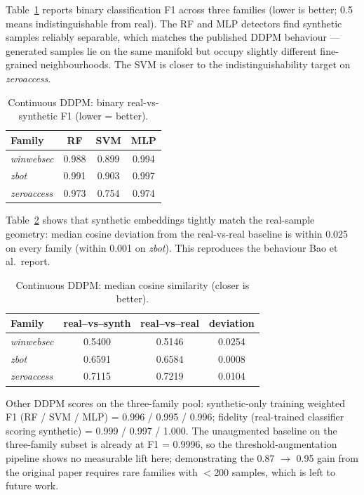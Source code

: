 \documentclass[runningheads]{llncs}
\begin{document}
Table~\ref{tab:ddpm-binclass} reports binary classification F1 across three
families (lower is better; 0.5 means indistinguishable from real). The RF and
MLP detectors find synthetic samples reliably separable, which matches the
published DDPM behaviour --- generated samples lie on the same manifold but
occupy slightly different fine-grained neighbourhoods. The SVM is closer to
the indistinguishability target on \emph{zeroaccess}.

\begin{table}[h]
\centering
\caption{Continuous DDPM: binary real-vs-synthetic F1 (lower = better).}
\label{tab:ddpm-binclass}
\begin{tabular}{lccc}
\toprule
Family & RF & SVM & MLP \\
\midrule
\emph{winwebsec}  & 0.988 & 0.899 & 0.994 \\
\emph{zbot}       & 0.991 & 0.903 & 0.997 \\
\emph{zeroaccess} & 0.973 & 0.754 & 0.974 \\
\bottomrule
\end{tabular}
\end{table}

Table~\ref{tab:ddpm-cosine} shows that synthetic embeddings tightly match the
real-sample geometry: median cosine deviation from the real-vs-real baseline
is within 0.025 on every family (within 0.001 on \emph{zbot}). This reproduces
the behaviour Bao et al.\ report.

\begin{table}[h]
\centering
\caption{Continuous DDPM: median cosine similarity (closer is better).}
\label{tab:ddpm-cosine}
\begin{tabular}{lccc}
\toprule
Family & real--vs--synth & real--vs--real & deviation \\
\midrule
\emph{winwebsec}  & 0.5400 & 0.5146 & 0.0254 \\
\emph{zbot}       & 0.6591 & 0.6584 & 0.0008 \\
\emph{zeroaccess} & 0.7115 & 0.7219 & 0.0104 \\
\bottomrule
\end{tabular}
\end{table}

Other DDPM scores on the three-family pool: synthetic-only training weighted
F1 (RF / SVM / MLP) = 0.996 / 0.995 / 0.996; fidelity (real-trained classifier
scoring synthetic) = 0.999 / 0.997 / 1.000. The unaugmented baseline on the
three-family subset is already at F1 = 0.9996, so the threshold-augmentation
pipeline shows no measurable lift here; demonstrating the 0.87 $\to$ 0.95
gain from the original paper requires rare families with $<$200 samples,
which is left to future work.
\end{document}
